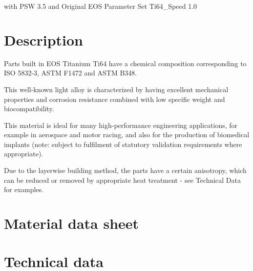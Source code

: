 \documentclass[10pt]{article}
\begin{document}
with PSW 3.5 and Original EOS Parameter Set Ti64\_Speed 1.0

\section*{Description}
Parts built in EOS Titanium Ti64 have a chemical composition corresponding to ISO 5832-3, ASTM F1472 and ASTM B348.

This well-known light alloy is characterized by having excellent mechanical properties and corrosion resistance combined with low specific weight and biocompatibility.

This material is ideal for many high-performance engineering applications, for example in aerospace and motor racing, and also for the production of biomedical implants (note: subject to fulfilment of statutory validation requirements where appropriate).

Due to the layerwise building method, the parts have a certain anisotropy, which can be reduced or removed by appropriate heat treatment - see Technical Data for examples.

\section*{Material data sheet}
\section*{Technical data}
\end{document}
